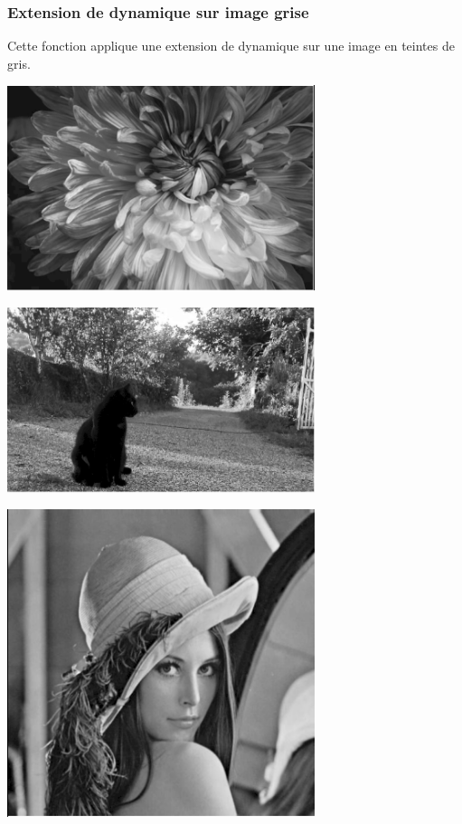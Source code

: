 \documentclass{article}
\begin{document}
\subsubsection{Extension de dynamique sur image grise}

Cette fonction
 applique une extension de dynamique sur une image en teintes de gris.

\begin{center} 
    \includegraphics[width=9cm]{../Image_fonctions/Multicolor/LinearGray.PNG}
\end{center}
\begin{center} 
    \includegraphics[width=9cm]{../Image_fonctions/Cat/LinearGray.PNG}
\end{center}
\begin{center} 
    \includegraphics[width=9cm]{../Image_fonctions/Lenna/LinearGray.PNG}
\end{center}
\end{document}
